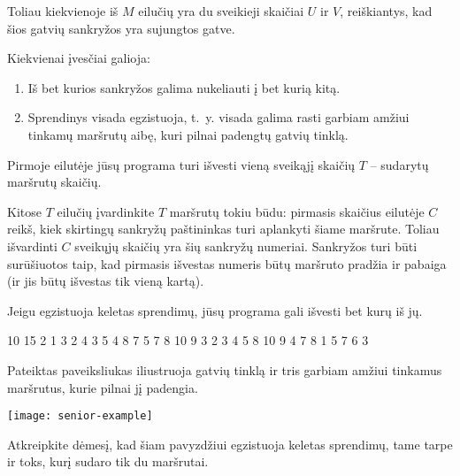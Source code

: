 \documentclass{boi2014-lt}
\begin{document}
    Toliau kiekvienoje iš $M$ eilučių yra du sveikieji skaičiai $U$ ir $V$, reiškiantys, kad šios gatvių sankryžos yra sujungtos gatve.

    Kiekvienai įvesčiai galioja:
    \begin{enumerate}
        \item Iš bet kurios sankryžos galima nukeliauti į bet kurią kitą.
        \item Sprendinys visada egzistuoja, t.~y. visada galima rasti garbiam
            amžiui tinkamų maršrutų aibę, kuri pilnai padengtų gatvių tinklą.
    \end{enumerate}

    \Output
    Pirmoje eilutėje jūsų programa turi išvesti vieną sveikąjį skaičių $T$ --
    sudarytų maršrutų skaičių.

    Kitose $T$ eilučių įvardinkite $T$ maršrutų tokiu būdu: pirmasis skaičius
    eilutėje $C$ reikš, kiek skirtingų sankryžų paštininkas turi aplankyti šiame
    maršrute. Toliau išvardinti $C$ sveikųjų skaičių yra šių sankryžų numeriai.
    Sankryžos turi būti surūšiuotos taip, kad pirmasis išvestas numeris būtų
    maršruto pradžia ir pabaiga (ir jis būtų išvestas tik vieną kartą).

    Jeigu egzistuoja keletas sprendimų, jūsų programa gali išvesti bet kurų
    iš jų.

    \Example

    \example
    {
        10 15  2  1 3  2 4  3 5  4 8  7  5 7  8  10  9
    }
    {
        3  2 3 4 5 8 10 9  4 7 8  1 5 7 6 3
    }
    {
        Pateiktas paveiksliukas iliustruoja gatvių tinklą ir tris garbiam amžiui
        tinkamus maršrutus, kurie pilnai jį padengia.

        \texttt{[image: senior-example]}

        Atkreipkite dėmesį, kad šiam pavyzdžiui egzistuoja keletas sprendimų,
        tame tarpe ir toks, kurį sudaro tik du maršrutai.
    }
\end{document}
